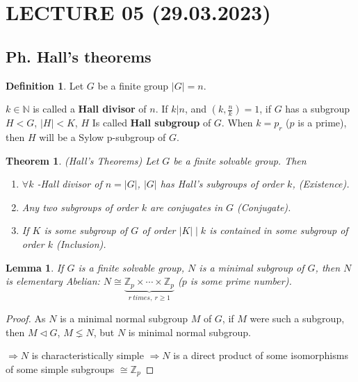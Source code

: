 \documentclass[12pt, a4paper]{article}
\newtheorem{theorem}{Theorem}[section]
\newcounter{lemmacounter}
\newtheorem{lemma}[lemmacounter]{Lemma}
\theoremstyle{definition}
\newtheorem{definition}{Definition}[section]
\begin{document}
\newpage
\section{LECTURE 05 (29.03.2023)}
\subsection{Ph. Hall's theorems}
\begin{definition}
    Let $G$ be a finite group $|G|=n $. 
    \par
    $k\in \mathbb{N}$ is called a \textbf{Hall divisor}
    of $n$. If $k|n$, and $(k,\frac{n}{k})=1$, if $G$ has a subgroup $H<G$, $|H|<K $, $H$ Is
    called \textbf{Hall subgroup} of $G$. When $k= p_r $ ($p$ is a prime), then $H$ will be a 
    Sylow p-subgroup of $G$.
\end{definition}
\begin{theorem}
    (Hall's Theorems) Let $G$ be a finite solvable group. Then
    \begin{enumerate}
        \item $\forall k $ -Hall divisor of $n=|G| $, $|G|$ has Hall's subgroups of order $k$,
        (Existence).
        \item Any two subgroups of order $k$ are conjugates in $G$ (Conjugate).
        \item If $K$ is some subgroup of $G$ of order $|K|\mid k $ is contained in some 
        subgroup of order $k$ (Inclusion).
    \end{enumerate} 
\end{theorem}
\setcounter{lemmacounter}{0}
\begin{lemma}
    If $G$ is a finite  solvable  group, $N$ is a minimal subgroup of $G$, then $N$ is 
    elementary Abelian: $N \cong \underbrace{{\mathbb{Z}}_p \times \cdots \times
    {\mathbb{Z}}_p}_{r\ times,\ r\geqslant 1} $ ($p$ is some prime number).
\end{lemma}
\begin{proof}
    As $N$ is a minimal normal subgroup $M$ of $G$, if $M$ were such a subgroup, then $M\lhd 
    G$, $M\lneq N$, but $N$ is minimal normal subgroup.
    \par
    $\Rightarrow N$ is characteristically simple $\Rightarrow N$ is a direct product of
    some isomorphisms of some simple subgroups $\cong \mathbb{Z}_p $
    \par
\end{proof}
\end{document}

